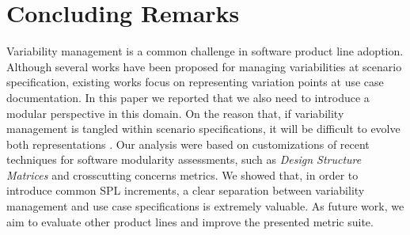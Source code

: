 \documentclass{acm_proc_article-sp}
\begin{document}


\section{Concluding Remarks}
\label{concluding-remarks}

Variability management is a common challenge in software product line adoption. Although several 
works have been proposed for managing variabilities at scenario specification, existing works focus on 
representing variation points at use case documentation. In this paper we reported that we also need to 
introduce a modular perspective in this domain. On the reason that, if variability management is tangled within scenario 
specifications, it will be difficult to evolve both representations . Our analysis were based on customizations of recent techniques for software modularity assessments, such as \emph{Design Structure Matrices} and crosscutting concerns metrics. We showed that, in order to introduce common SPL increments, a clear separation between variability management and use case specifications is extremely valuable. As future work, we aim to evaluate other product lines and improve the presented metric suite. 

%

%
%
\end{document}
